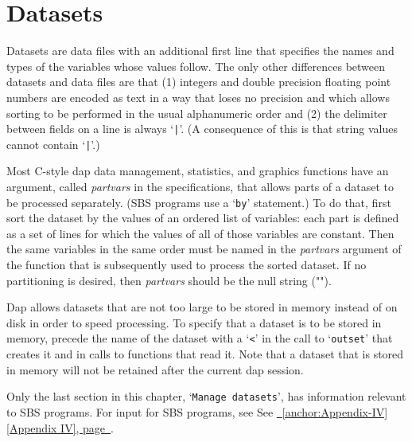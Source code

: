\documentclass{book}
\newcommand\Texinfocommandstyletextvar[1]{{\normalfont{}\textsl{#1}}}%
\renewcommand{\_}{\Texinfounderscore\discretionary{}{}{}}
\begin{document}
\chapter{{Datasets}}
\label{anchor:Datasets}%

Datasets
%
are data files with an additional first line that
specifies the names and types of the variables whose values follow.
The only other differences between datasets and data files are that
(1) integers and double precision floating point numbers are encoded
as text in a way that loses no precision and which allows sorting
to be performed in the usual alphanumeric order and (2) the delimiter
between fields on a line is always `\texttt{|}'.  (A consequence of this
is that string values
%
%
cannot contain `\texttt{|}'.)

%
%
%
Most C-style dap data management, statistics, and graphics functions
have an argument, called \Texinfocommandstyletextvar{partvars} in the specifications,
that allows parts of a dataset to be processed separately.
(SBS programs use a `\texttt{by}' statement.)
To do that, first sort the dataset by the values of an
ordered list of variables: each part is defined as a set of lines
for which the values of all of those variables are constant.
Then the same variables in the same order must be named in the \Texinfocommandstyletextvar{partvars} argument 
of the function that is subsequently used to process the sorted dataset. 
If no partitioning is desired, then \Texinfocommandstyletextvar{partvars} should be the null string ("").

Dap allows datasets
%
%
%
that are not too large to be stored in memory instead of on disk in order
to speed processing.
To specify that a dataset is to be stored in memory,
precede the name of the dataset with a `\texttt{<}'
in the call to `\texttt{outset}' that creates it and in calls to functions that read it.
Note that a dataset that is stored in memory will not be retained after the
current dap session.

Only the last section in this chapter, `\texttt{Manage datasets}', has information
relevant to SBS programs.
For input for SBS programs, see See \hyperref[anchor:Appendix-IV]{\chaptername~\ref*{anchor:Appendix-IV} [Appendix IV], page~\pageref*{anchor:Appendix-IV}}.
\end{document}
